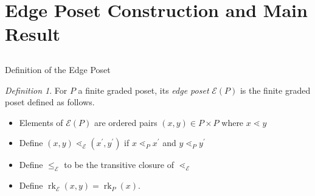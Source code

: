 \documentclass{beamer}
\theoremstyle{remark}
\newtheorem{defn}[thm]{Definition}
\newcommand\rk{\operatorname{rk}}
\begin{document}










\section{Edge Poset Construction and Main Result}
\subsection{}

\begin{frame}{Definition of the Edge Poset}
\begin{defn}
\label{defn:functor_of_edges}
For $P$ a finite graded poset, its \textit{edge poset} $\mathcal{E}(P)$ is the finite graded poset defined as follows. 
\begin{itemize}

\item Elements of $\mathcal{E}(P)$ are ordered pairs $(x,y)\in P\times P$ where $x\lessdot y$

\item Define $(x,y) \lessdot_{\mathcal{E}} (x^\prime,y^\prime)$ if $x\lessdot_P x^\prime$ and $y\lessdot_P y^\prime$

\item Define $\le_{\mathcal{E}}$ to be the transitive closure of $\lessdot_{\mathcal{E}}$

\item Define $\rk_{\mathcal{E}}(x,y) = \rk_P(x)$.
\end{itemize}
\end{defn}
\end{frame}
\end{document}
